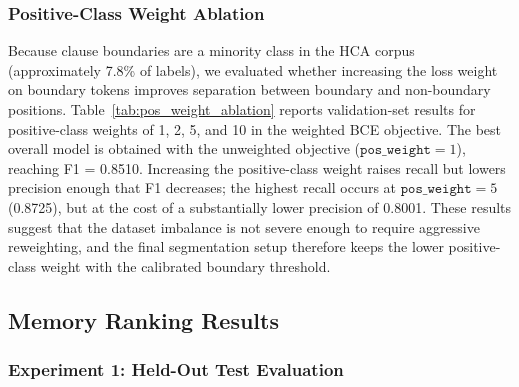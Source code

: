 \documentclass[conference]{IEEEtran}
\renewcommand{\arraystretch}{0.9}
\begin{document}
\subsubsection{Positive-Class Weight Ablation}

Because clause boundaries are a minority class in the HCA corpus (approximately 7.8\% of labels), we evaluated whether increasing the loss weight on boundary tokens improves separation between boundary and non-boundary positions. Table~\ref{tab:pos_weight_ablation} reports validation-set results for positive-class weights of 1, 2, 5, and 10 in the weighted BCE objective. The best overall model is obtained with the unweighted objective ($\texttt{pos\_weight}=1$), reaching F1 = 0.8510. Increasing the positive-class weight raises recall but lowers precision enough that F1 decreases; the highest recall occurs at $\texttt{pos\_weight}=5$ (0.8725), but at the cost of a substantially lower precision of 0.8001. These results suggest that the dataset imbalance is not severe enough to require aggressive reweighting, and the final segmentation setup therefore keeps the lower positive-class weight with the calibrated boundary threshold.

\begin{table}[H]
\centering
\caption{Validation-set ablation for positive-class weighting in the clause-boundary loss.}
\label{tab:pos_weight_ablation}
\footnotesize
\renewcommand{\arraystretch}{1.1}
\end{table}

\subsection{Memory Ranking Results}

\subsubsection{Experiment 1: Held-Out Test Evaluation}
\end{document}
